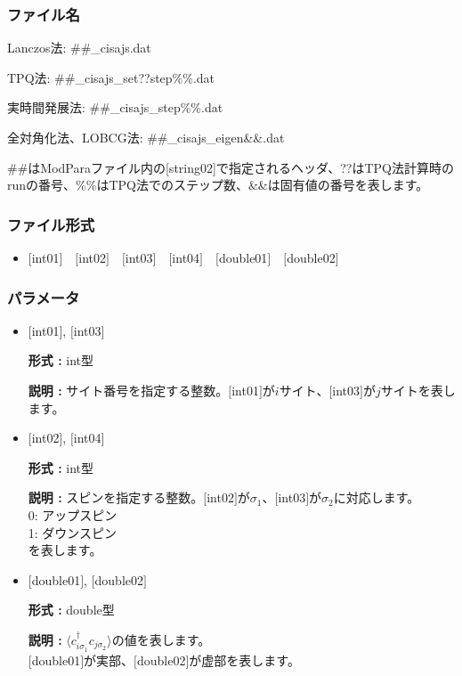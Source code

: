 \subsubsection{ファイル名}
 \begin{itemize}
   \item{Lanczos法:}  \#\#\_cisajs.dat
   \item{TPQ法:} \#\#\_cisajs\_set??step\%\%.dat
   {\item{実時間発展法:} \#\#\_cisajs\_step\%\%.dat}
   \item{全対角化法、LOBCG法:}  \#\#\_cisajs\_eigen{\&\&}.dat
  \end{itemize}
  \#\#はModParaファイル内の[string02]で指定されるヘッダ、??はTPQ法計算時のrunの番号、\%\%はTPQ法でのステップ数、\&\&は固有値の番号を表します。


\subsubsection{ファイル形式}
 \begin{itemize}
   \item  $[$int01$]$~~$[$int02$]$~~$[$int03$]$~~$[$int04$]$~~$[$double01$]$~~$[$double02$]$
  \end{itemize}
\subsubsection{パラメータ}
 \begin{itemize}

  \item  $[$int01$]$, $[$int03$]$

 {\bf 形式 :} int型

{\bf 説明 :} サイト番号を指定する整数。$[$int01$]$が$i$サイト、$[$int03$]$が$j$サイトを表します。
 
  \item  $[$int02$]$, $[$int04$]$

 {\bf 形式 :} int型 

{\bf 説明 :} スピンを指定する整数。$[$int02$]$が$\sigma_1$、$[$int03$]$が$\sigma_2$に対応します。\\
0: アップスピン\\
1: ダウンスピン\\
を表します。

  \item  $[$double01$]$, $[$double02$]$

 {\bf 形式 :} double型 

{\bf 説明 :} $\langle c_{i\sigma_1}^{\dagger}c_{j\sigma_2}\rangle$の値を表します。\\
$[$double01$]$が実部、$[$double02$]$が虚部を表します。\\
\end{itemize}

